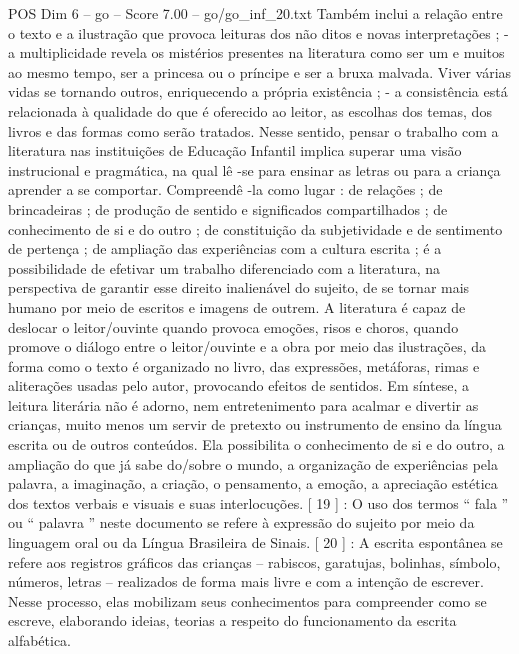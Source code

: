 \begin{textsample}{POS Dim 6 – go – Score 7.00 – go/go\_inf\_20.txt}
Também inclui a relação entre o texto e a ilustração que provoca leituras dos não ditos e novas interpretações ; - a multiplicidade revela os mistérios presentes na literatura como ser um e muitos ao mesmo tempo, ser a princesa ou o príncipe e ser a bruxa malvada.
Viver várias vidas se tornando outros, enriquecendo a própria existência ; - a consistência está relacionada à qualidade do que é oferecido ao leitor, as escolhas dos temas, dos livros e das formas como serão tratados.
Nesse sentido, pensar o trabalho com a literatura nas instituições de Educação Infantil implica superar uma visão instrucional e pragmática, na qual lê -se para ensinar as letras ou para a criança aprender a se comportar.
Compreendê -la como lugar : de relações ; de brincadeiras ; de produção de sentido e significados compartilhados ; de conhecimento de si e do outro ; de constituição da subjetividade e de sentimento de pertença ; de ampliação das experiências com a cultura escrita ; é a possibilidade de efetivar um trabalho diferenciado com a literatura, na perspectiva de garantir esse direito inalienável do sujeito, de se tornar mais humano por meio de escritos e imagens de outrem.
A literatura é capaz de deslocar o leitor/ouvinte quando provoca emoções, risos e choros, quando promove o diálogo entre o leitor/ouvinte e a obra por meio das ilustrações, da forma como o texto é organizado no livro, das expressões, metáforas, rimas e aliterações usadas pelo autor, provocando efeitos de sentidos.
Em síntese, a leitura literária não é adorno, nem entretenimento para acalmar e divertir as crianças, muito menos um servir de pretexto ou instrumento de ensino da língua escrita ou de outros conteúdos.
Ela possibilita o conhecimento de si e do outro, a ampliação do que já sabe do/sobre o mundo, a organização de experiências pela palavra, a imaginação, a criação, o pensamento, a emoção, a apreciação estética dos textos verbais e visuais e suas interlocuções. [ 19 ] : O uso dos termos “ fala ” ou “ palavra ” neste documento se refere à expressão do sujeito por meio da linguagem oral ou da Língua Brasileira de Sinais. [ 20 ] : A escrita espontânea se refere aos registros gráficos das crianças – rabiscos, garatujas, bolinhas, símbolo, números, letras – realizados de forma mais livre e com a intenção de escrever.
Nesse processo, elas mobilizam seus conhecimentos para compreender como se escreve, elaborando ideias, teorias a respeito do funcionamento da escrita alfabética.

\end{textsample}
